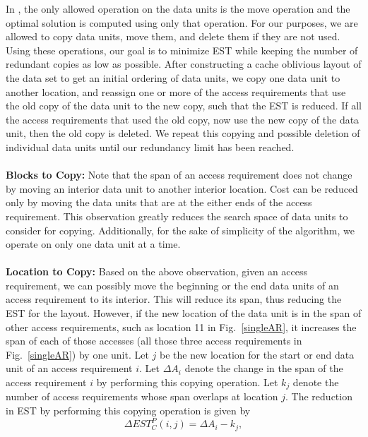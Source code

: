 In \cite{cacheobliviouslayout}, the only allowed operation on the data units is
the move operation and the optimal solution is computed using only that
operation. For our purposes, we are allowed to copy data units, move them, and
delete them if they are not used. Using these operations, our goal is to minimize EST
while keeping the number of redundant copies as low as possible. After constructing a cache oblivious layout 
of the data set to get an initial ordering of data units, we copy one data unit
to another location, and reassign one or more of the access requirements that
use the old copy of the data unit to the new copy, such that the EST is
reduced.  If all the access requirements that used the old copy, now use the
new copy of the data unit, then the old copy is deleted.  We repeat this
copying and possible deletion of individual data units until our redundancy
limit has been reached. \\
\\
{\bf Blocks to Copy:} Note that the span of an access requirement does not
change by moving an interior data unit to another interior location. Cost can
be reduced only by moving the data units that are at the either ends of the access
requirement. This observation greatly reduces the search space of data units to
consider for copying. Additionally, for the sake of simplicity of the algorithm, we operate
on only one data unit at a time. \\
\\
{\bf Location to Copy:} Based on the above observation, given an access
requirement, we can possibly move the beginning or the end data units of an
access requirement to its interior. This will reduce its span, thus reducing
the EST for the layout. However, if the new location of the data unit is in the
span of other access requirements, such as location 11 in Fig.~\ref{singleAR},
it increases the span of each of those accesses (all those three access
requirements in Fig.~\ref{singleAR}) by one unit.
Let $j$ be the new location for the start or end data unit of an access
requirement $i$. Let $\Delta A_i$ denote the change in the span of the access
requirement $i$ by performing this copying operation. Let  $k_j$ denote the
number of access requirements whose span overlaps at location $j$.  The
reduction in EST by performing this copying operation is given by 
\[ 
\Delta EST_C^P(i,j) = \Delta A_i - k_j, 
\]
